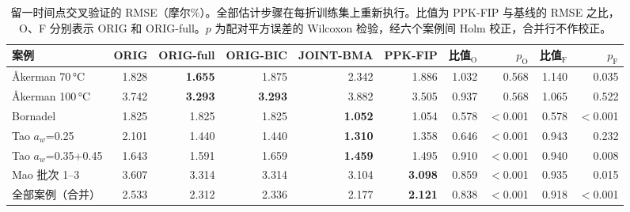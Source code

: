 \begin{table}[t]
\centering
\caption{留一时间点交叉验证的 RMSE（摩尔\%）。全部估计步骤在每折训练集上重新执行。比值为 PPK-FIP 与基线的 RMSE 之比，O、F 分别表示 ORIG 和 ORIG-full。$p$ 为配对平方误差的 Wilcoxon 检验，经六个案例间 Holm 校正，合并行不作校正。}\label{tab:loto}
\footnotesize
\begin{adjustbox}{max width=\linewidth}
\begin{tabular}{lrrrrrrrrr}
\toprule
案例 & ORIG & ORIG-full & ORIG-BIC & JOINT-BMA & PPK-FIP & 比值$_\mathrm{O}$ & $p_\mathrm{O}$ & 比值$_\mathrm{F}$ & $p_\mathrm{F}$ \\
\midrule
Åkerman 70\,°C & 1.828 & \textbf{1.655} & 1.875 & 2.342 & 1.886 & 1.032 & 0.568 & 1.140 & 0.035 \\
Åkerman 100\,°C & 3.742 & \textbf{3.293} & \textbf{3.293} & 3.882 & 3.505 & 0.937 & 0.568 & 1.065 & 0.522 \\
Bornadel & 1.825 & 1.825 & 1.825 & \textbf{1.052} & 1.054 & 0.578 & $<$0.001 & 0.578 & $<$0.001 \\
Tao $a_w$=0.25 & 2.101 & 1.440 & 1.440 & \textbf{1.310} & 1.358 & 0.646 & $<$0.001 & 0.943 & 0.232 \\
Tao $a_w$=0.35+0.45 & 1.643 & 1.591 & 1.659 & \textbf{1.459} & 1.495 & 0.910 & $<$0.001 & 0.940 & 0.008 \\
Mao 批次 1--3 & 3.607 & 3.314 & 3.314 & 3.104 & \textbf{3.098} & 0.859 & $<$0.001 & 0.935 & 0.015 \\
\midrule
全部案例（合并） & 2.533 & 2.312 & 2.336 & 2.177 & \textbf{2.121} & 0.838 & $<$0.001 & 0.918 & $<$0.001 \\
\bottomrule
\end{tabular}
\end{adjustbox}
\end{table}
